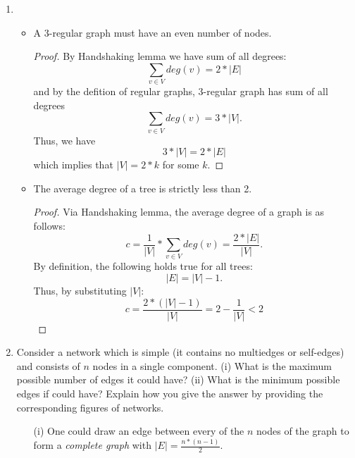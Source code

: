 \documentclass[12pt,a4paper,oneside,draft]{article}
\begin{document}
\begin{enumerate}
\begin{itemize}
    \end{itemize}
  \item
    \begin{itemize}
      \item
        A 3-regular graph must have an even number of nodes.
        \begin{proof}
          By Handshaking lemma we have sum of all degrees: $$\sum_{v \in V} deg(v) = 2 * |E|$$
          and by the defition of regular graphs, 3-regular graph has sum of all degrees
          $$\sum_{v \in V} deg(v) = 3 * |V|.$$
          Thus, we have $$3 * |V| = 2 * |E|$$ which implies that $|V| = 2 * k$ for some $k$.
        \end{proof}
      \item
        The average degree of a tree is strictly less than 2.
        \begin{proof}
          Via Handshaking lemma, the average degree of a graph is as follows:
            $$c = \frac{1}{|V|} * \sum_{v \in V} deg(v) = \frac{2 * |E|}{|V|}.$$
          By definition, the following holds true for all trees: $$|E| = |V| - 1.$$
          Thus, by substituting $|V|$:
            $$c = \frac{2 * (|V| - 1)}{|V|} = 2 - \frac{1}{|V|} < 2$$
        \end{proof}
    \end{itemize}
  \item
    Consider a network which is simple (it contains no multiedges or self-edges)
    and consists of $n$ nodes in a single component.
    \newline
    (i) What is the maximum possible number of edges it could have?
    \newline
    (ii) What is the minimum possible edges if could have?
    \newline
    Explain how you give the answer by providing the corresponding figures of networks.
    \begin{itemize}
      \item [(i) ]
        One could draw an edge between every of the $n$ nodes of the graph to
        form a \textit{complete graph} with $|E| = \frac{n * (n - 1)}{2}$.
        \newline
        \begin{center}
\end{center}
\end{itemize}
\end{enumerate}
\end{document}
